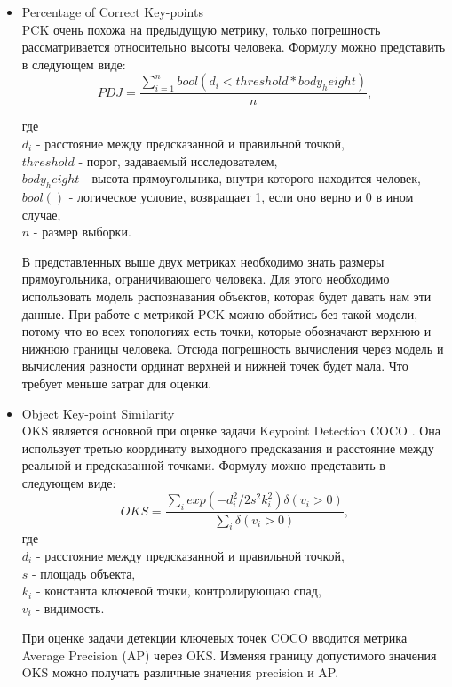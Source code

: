 \begin{itemize}
	\item Percentage of Correct Key-points\\
	PCK очень похожа на предыдущую метрику, только погрешность рассматривается относительно высоты человека. Формулу можно представить в следующем виде:
	\begin{equation}
		PDJ = \frac{\sum_{i=1}^{n} bool(d_i < threshold * body_height)}{n},
	\end{equation}
	
	где\\
	$d_i$ - расстояние между предсказанной и правильной точкой,\\
	$threshold$ - порог, задаваемый исследователем,\\
	$body_height$ - высота прямоугольника, внутри которого находится человек,\\
	$bool()$ - логическое условие, возвращает 1, если оно верно и 0 в ином случае,\\
	$n$ - размер выборки.
	
	В представленных выше двух метриках необходимо знать размеры прямоугольника, ограничивающего человека. Для этого необходимо использовать модель распознавания объектов, которая будет давать нам эти данные. При работе с метрикой PCK можно обойтись без такой модели, потому что во всех топологиях есть точки, которые обозначают верхнюю и нижнюю границы человека. Отсюда погрешность вычисления через модель и вычисления разности ординат верхней и нижней точек будет мала. Что требует меньше затрат для оценки.
	
	\item Object Key-point Similarity\\
	OKS является основной при оценке задачи Keypoint Detection COCO \cite{COCO_topology}. Она использует третью координату выходного предсказания и расстояние между реальной и предсказанной точками. Формулу можно представить в следующем виде:
	\begin{equation}
		OKS = \frac{\sum_{i} exp\left( - d_i^2 / 2s^2k_i^2\right)\delta\left(v_i > 0\right)}{\sum_{i} \delta\left(v_i > 0\right)},
	\end{equation}
	где\\
	$d_i$ - расстояние между предсказанной и правильной точкой,\\
	$s$ - площадь объекта,\\
	$k_i$ - константа ключевой точки, контролирующаю спад,\\
	$v_i$ - видимость.
	
	При оценке задачи детекции ключевых точек COCO вводится метрика Average Precision (AP) через OKS. Изменяя границу допустимого значения OKS можно получать различные значения precision и AP.
\end{itemize}

